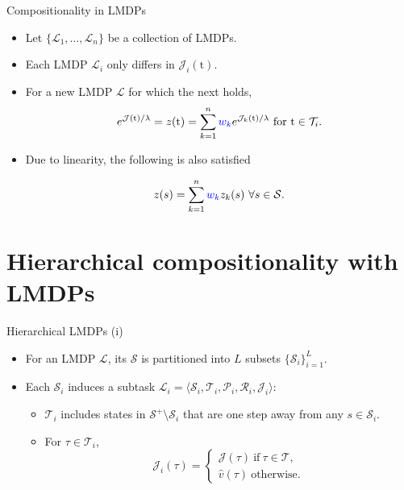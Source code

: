 \documentclass{beamer}
\theoremstyle{mystyle}
\newcommand{\tS}{\text{t}}   %
\newcommand{\cJ}{\mathcal{J}}
\newcommand{\cL}{\mathcal{L}}
\newcommand{\cP}{\mathcal{P}}
\newcommand{\cR}{\mathcal{R}}
\newcommand{\cS}{\mathcal{S}}
\newcommand{\cT}{\mathcal{T}}
\begin{document}
\begin{frame}{Compositionality in LMDPs}
    \begin{itemize}
        \item Let $\{\cL_1,\ldots,\cL_n\}$ be a collection of LMDPs.

        \item Each LMDP $\cL_i$ {\color{blue} only differs in $\cJ_i(\tS)$}.

        \item For a new LMDP $\cL$ for which the next holds,
              \begin{equation*}
                  e^{\cJ(\tS)/\lambda} = z(\tS) = \sum_{k=1}^n {\color{blue} w_k} e^{\cJ_k(\tS)/\lambda} \ \text{for} \ \tS \in \cT_i.
              \end{equation*}

        \item Due to linearity, the following is also satisfied

              \begin{equation*}
                  z(s) =  \sum_{k=1}^n {\color{blue} w_k} z_k(s) \ \forall s \in \cS.
              \end{equation*}

    \end{itemize}

\end{frame}

\section{Hierarchical compositionality with LMDPs}
\begin{frame}{Hierarchical LMDPs (i)}

    \begin{itemize}
        \item For an LMDP $\cL$, its {\color{blue} $\cS$ is partitioned} into $L$ subsets $\{\cS_i\}_{i=1}^L$.
        \item Each $\cS_i$ induces a subtask $\cL_i=\langle\cS_i,\cT_i,\cP_i,\cR_i,\cJ_i\rangle$:
              \begin{itemize}
                  \item $\cT_i$ includes states in $\cS^+\setminus\cS_i$ that are one step away from any $s \in \cS_i$.
                  \item For $\tau\in\cT_i$,
                        \[
                            \cJ_i(\tau)=\begin{cases}
                                \cJ(\tau) \ \text{if} \ \tau\in\cT, \\
                                \hat{v}(\tau) \ \text{otherwise.}
                            \end{cases}
                        \]
              \end{itemize}
    \end{itemize}

\end{frame}
\end{document}
